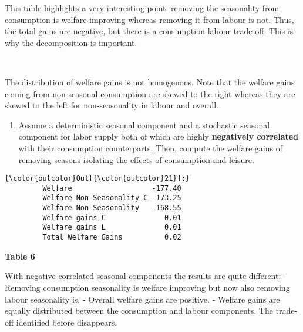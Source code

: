 \documentclass[11pt]{article}
\providecommand{\tightlist}{%
      \setlength{\itemsep}{0pt}\setlength{\parskip}{0pt}}
\begin{document}
This table highlights a very interesting point: removing the seasonality from consumption is welfare-improving whereas removing it from labour is not. Thus, the total gains are negative, but there is a consumption labour trade-off. This is why the decomposition is important.


    \begin{center}
    \end{center}
    { \hspace*{\fill} \\}
    
    The distribution of welfare gains is not homogenous. Note that the
welfare gains coming from non-seasonal consumption are skewed to the
right whereas they are skewed to the left for non-seasonality in labour
and overall.

\begin{enumerate}
\def\labelenumi{\alph{enumi})}
\setcounter{enumi}{1}
\tightlist
\item
  Assume a deterministic seasonal component and a stochastic seasonal
  component for labor supply both of which are highly \textbf{negatively
  correlated} with their consumption counterparts. Then, compute the
  welfare gains of removing seasons isolating the effects of consumption
  and leisure.
\end{enumerate}


\begin{Verbatim}[commandchars=\\\{\}]
{\color{outcolor}Out[{\color{outcolor}21}]:}                                  
         Welfare                   -177.40
         Welfare Non-Seasonality C -173.25
         Welfare Non-Seasonality   -168.55
         Welfare gains C              0.01
         Welfare gains L              0.01
         Total Welfare Gains          0.02
\end{Verbatim}
            
    \textbf{Table 6}

With negative correlated seasonal components the results are quite
different: - Removing consumption seasonality is welfare improving but
now also removing labour seasonality is. - Overall welfare gains are
positive. - Welfare gains are equally distributed between the
consumption and labour components. The trade-off identified before
disappears.


    \begin{center}
    \end{center}
    { \hspace*{\fill} \\}
    
\end{document}
